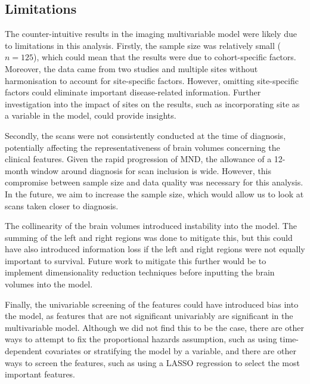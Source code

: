 \subsection{Limitations}
The counter-intuitive results in the imaging multivariable model were likely due to limitations in this analysis.
Firstly, the sample size was relatively small ($n=125$), which could mean that the results were due to cohort-specific factors.
Moreover, the data came from two studies and multiple sites without harmonisation to account for site-specific factors.
However, omitting site-specific factors could eliminate important disease-related information.
Further investigation into the impact of sites on the results, such as incorporating site as a variable in the model, could provide insights.

Secondly, the scans were not consistently conducted at the time of diagnosis, potentially affecting the representativeness of brain volumes concerning the clinical features.
Given the rapid progression of MND, the allowance of a 12-month window around diagnosis for scan inclusion is wide. However, this compromise between sample size and data quality was necessary for this analysis.
In the future, we aim to increase the sample size, which would allow us to look at scans taken closer to diagnosis.

The collinearity of the brain volumes introduced instability into the model.
The summing of the left and right regions was done to mitigate this, but this could have also introduced information loss if the left and right regions were not equally important to survival.
Future work to mitigate this further would be to implement dimensionality reduction techniques before inputting the brain volumes into the model.

Finally, the univariable screening of the features could have introduced bias into the model, as features that are not significant univariably are significant in the multivariable model.
Although we did not find this to be the case, there are other ways to attempt to fix the proportional hazards assumption, such as using time-dependent covariates or stratifying the model by a variable, and there are other ways to screen the features, such as using a LASSO regression to select the most important features.


